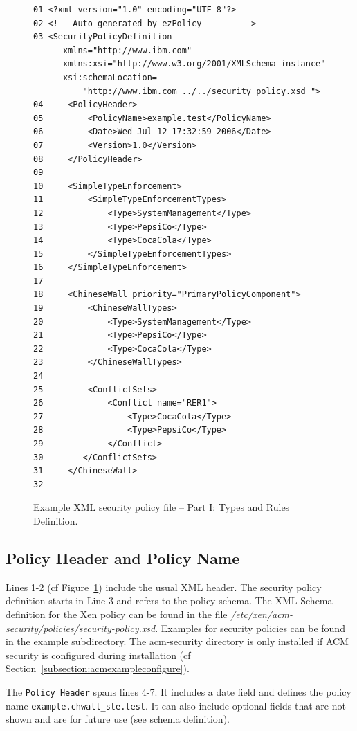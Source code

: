 \documentclass[11pt,twoside,final,openright]{report}
\begin{document}
\begin{figure}
\begin{scriptsize}
\begin{verbatim}
01 <?xml version="1.0" encoding="UTF-8"?>
02 <!-- Auto-generated by ezPolicy        -->
03 <SecurityPolicyDefinition
      xmlns="http://www.ibm.com"
      xmlns:xsi="http://www.w3.org/2001/XMLSchema-instance"
      xsi:schemaLocation=
          "http://www.ibm.com ../../security_policy.xsd ">
04     <PolicyHeader>
05         <PolicyName>example.test</PolicyName>
06         <Date>Wed Jul 12 17:32:59 2006</Date>
07         <Version>1.0</Version>
08     </PolicyHeader>
09
10     <SimpleTypeEnforcement>
11         <SimpleTypeEnforcementTypes>
12             <Type>SystemManagement</Type>
13             <Type>PepsiCo</Type>
14             <Type>CocaCola</Type>
15         </SimpleTypeEnforcementTypes>
16     </SimpleTypeEnforcement>
17
18     <ChineseWall priority="PrimaryPolicyComponent">
19         <ChineseWallTypes>
20             <Type>SystemManagement</Type>
21             <Type>PepsiCo</Type>
22             <Type>CocaCola</Type>
23         </ChineseWallTypes>
24
25         <ConflictSets>
26             <Conflict name="RER1">
27                 <Type>CocaCola</Type>
28                 <Type>PepsiCo</Type>
29             </Conflict>
30        </ConflictSets>
31     </ChineseWall>
32
\end{verbatim}
\end{scriptsize}
\caption{Example XML security policy file -- Part I: Types and Rules Definition.}
\label{fig:acmxmlfilea}
\end{figure}

\subsection{Policy Header and Policy Name}
\label{subsection:acmnaming}
Lines 1-2 (cf Figure~\ref{fig:acmxmlfilea}) include the usual XML
header. The security policy definition starts in Line 3 and refers to
the policy schema. The XML-Schema definition for the Xen policy can be
found in the file
\textit{/etc/xen/acm-security/policies/security-policy.xsd}. Examples
for security policies can be found in the example subdirectory. The
acm-security directory is only installed if ACM security is configured
during installation (cf Section~\ref{subsection:acmexampleconfigure}).

The \verb|Policy Header| spans lines 4-7. It includes a date field and
defines the policy name \verb|example.chwall_ste.test|. It can also
include optional fields that are not shown and are for future use (see
schema definition).
\end{document}
